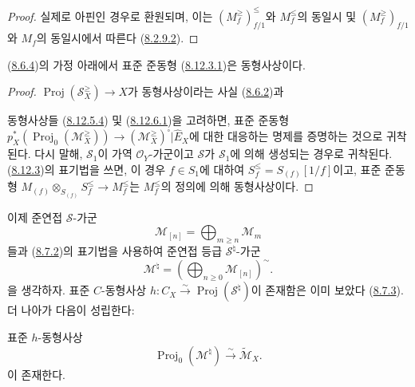 \begin{proof}
실제로 아핀인 경우로 환원되며, 이는 $(M_f^{\geq})_{f/1}^{\leq}$와
$M_f^{\leq}$의 동일시 및 $(M_f^{\geq})_{f/1}$와 $M_f$의 동일시에서
따른다 (\hyperref[II.8.2.9.2-ko]{8.2.9.2}).
\end{proof}

\begin{proposition}[8.12.8]
\label{II.8.12.8-ko}
(\hyperref[II.8.6.4-ko]{8.6.4})의 가정 아래에서 표준 준동형
(\hyperref[II.8.12.3.1-ko]{8.12.3.1})은 동형사상이다.
\end{proposition}

\begin{proof}
$\operatorname{Proj}(\mathcal{S}_X^{\geq})\to X$가 동형사상이라는 사실
(\hyperref[II.8.6.2-ko]{8.6.2})과

동형사상들 (\hyperref[II.8.12.5.4-ko]{8.12.5.4}) 및
(\hyperref[II.8.12.6.1-ko]{8.12.6.1})을 고려하면, 표준 준동형
$p_X^*(\operatorname{Proj}_0(\mathcal{M}_X^{\geq}))
\to(\mathcal{M}_X^{\geq})^{\square}|\widehat{E}_X$에 대한 대응하는
명제를 증명하는 것으로 귀착된다. 다시 말해, $\mathcal{S}_1$이 가역
$\mathcal{O}_Y$-가군이고 $\mathcal{S}$가 $\mathcal{S}_1$에 의해
생성되는 경우로 귀착된다. (\hyperref[II.8.12.3-ko]{8.12.3})의 표기법을
쓰면, 이 경우 $f\in S_1$에 대하여
$S_f^{\leq}=S_{(f)}[1/f]$이고, 표준 준동형
$M_{(f)}\otimes_{S_{(f)}}S_f^{\leq}\to M_f^{\leq}$는
$M_f^{\leq}$의 정의에 의해 동형사상이다.
\end{proof}

\begin{env}[8.12.9]
\label{II.8.12.9-ko}
이제 준연접 $\mathcal{S}$-가군
\[
  \mathcal{M}_{[n]}=\bigoplus_{m\geqslant n}\mathcal{M}_m
\]
들과 (\hyperref[II.8.7.2-ko]{8.7.2})의 표기법을 사용하여 준연접 등급
$\mathcal{S}^{\natural}$-가군
\begin{equation}
\label{II.8.12.9.1-ko}
  \mathcal{M}^{\natural}
  =\left(\bigoplus_{n\geqslant0}\mathcal{M}_{[n]}\right)^{\sim}.
\tag{8.12.9.1}
\end{equation}
을 생각하자. 표준 $C$-동형사상
$h:C_X\xrightarrow{\sim}\operatorname{Proj}(\mathcal{S}^{\natural})$이
존재함은 이미 보았다 (\hyperref[II.8.7.3-ko]{8.7.3}). 더 나아가 다음이
성립한다:
\end{env}

\begin{proposition}[8.12.10]
\label{II.8.12.10-ko}
표준 $h$-동형사상
\begin{equation}
\label{II.8.12.10.1-ko}
  \operatorname{Proj}_0(\mathcal{M}^{\natural})
  \xrightarrow{\sim}\widetilde{\mathcal{M}}_X.
\tag{8.12.10.1}
\end{equation}
이 존재한다.
\end{proposition}


